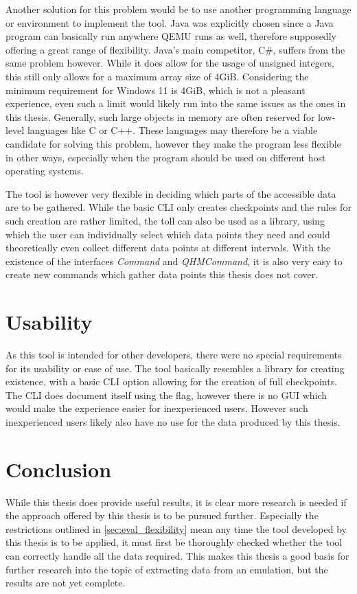 Another solution for this problem would be to use another programming language or environment to implement the tool.
Java was explicitly chosen since a Java program can basically run anywhere QEMU runs as well,
therefore supposedly offering a great range of flexibility.
Java's main competitor, C#, suffers from the same problem however.
While it does allow for the usage of unsigned integers,
this still only allows for a maximum array size of 4GiB.
Considering the minimum requirement for Windows 11 is 4GiB,
which is not a pleasant experience,
even such a limit would likely run into the same issues as the ones in this thesis.
Generally, such large objects in memory are often reserved for low-level languages like C or C++.
These languages may therefore be a viable candidate for solving this problem,
however they make the program less flexible in other ways,
especially when the program should be used on different host operating systems.

The tool is however very flexible in deciding which parts of the accessible data are to be gathered.
While the basic CLI only creates checkpoints and the rules for such creation are rather limited,
the toll can also be used as a library, using which the user can individually select which data points they need
and could theoretically even collect different data points at different intervals.
With the existence of the interfaces \emph{Command} and \emph{QHMCommand},
it is also very easy to create new commands which gather data points this thesis does not cover.

\section{Usability}
As this tool is intended for other developers,
there were no special requirements for its usability or ease of use.
The tool basically resembles a library for creating existence,
with a basic CLI option allowing for the creation of full checkpoints.
The CLI does document itself using the  flag,
however there is no GUI which would make the experience easier for inexperienced users.
However such inexperienced users likely also have no use for the data produced by this thesis.

\section{Conclusion}
While this thesis does provide useful results,
it is clear more research is needed if the approach offered by this thesis is to be pursued further.
Especially the restrictions outlined in \autoref{sec:eval_flexibility}
mean any time the tool developed by this thesis is to be applied,
it must first be thoroughly checked whether the tool can correctly handle all the data required.
This makes this thesis a good basis for further research into the topic of extracting data from an emulation,
but the results are not yet complete.